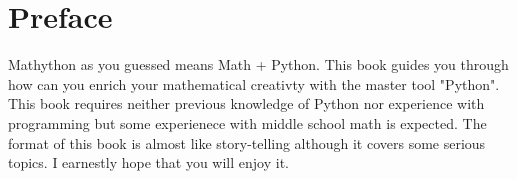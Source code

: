 \chapter*{Preface}
Mathython as you guessed means Math + Python. This book guides you through how can you enrich your mathematical creativty with the master tool "Python". This book requires neither previous knowledge of Python nor experience with programming but some experienece with middle school math is expected. The format of this book is almost like story-telling although it covers some serious topics. I earnestly hope that you will enjoy it.
